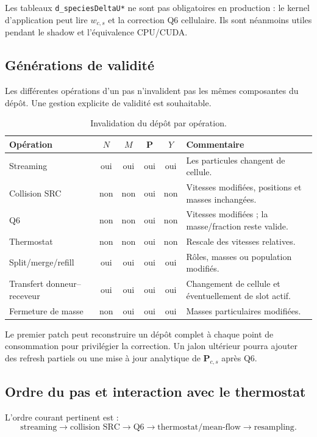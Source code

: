 \documentclass[11pt,a4paper]{article}
\newcommand{\code}[1]{\texttt{#1}}
\newcommand{\vect}[1]{\bm{#1}}
\begin{document}
Les tableaux \code{d\_speciesDeltaU*} ne sont pas obligatoires en production : le kernel d'application peut lire \(w_{c,s}\) et la correction Q6 cellulaire. Ils sont néanmoins utiles pendant le shadow et l'équivalence CPU/CUDA.

\subsection{Générations de validité}

Les différentes opérations d'un pas n'invalident pas les mêmes composantes du dépôt. Une gestion explicite de validité est souhaitable.

\begin{table}[H]
\centering
\caption{Invalidation du dépôt par opération.}
\begin{tabularx}{\textwidth}{@{}lccccX@{}}
\toprule
Opération & $N$ & $M$ & $\vect P$ & $Y$ & Commentaire \\
\midrule
Streaming & oui & oui & oui & oui & Les particules changent de cellule. \\
Collision SRC & non & non & oui & non & Vitesses modifiées, positions et masses inchangées. \\
Q6 & non & non & oui & non & Vitesses modifiées ; la masse/fraction reste valide. \\
Thermostat & non & non & oui & non & Rescale des vitesses relatives. \\
Split/merge/refill & oui & oui & oui & oui & Rôles, masses ou population modifiés. \\
Transfert donneur--receveur & oui & oui & oui & oui & Changement de cellule et éventuellement de slot actif. \\
Fermeture de masse & non & oui & oui & oui & Masses particulaires modifiées. \\
\bottomrule
\end{tabularx}
\end{table}

Le premier patch peut reconstruire un dépôt complet à chaque point de consommation pour privilégier la correction. Un jalon ultérieur pourra ajouter des refresh partiels ou une mise à jour analytique de \(\vect P_{c,s}\) après Q6.

\subsection{Ordre du pas et interaction avec le thermostat}

L'ordre courant pertinent est :
\begin{equation}
  \text{streaming} \rightarrow \text{collision SRC} \rightarrow \text{Q6}
  \rightarrow \text{thermostat/mean-flow} \rightarrow \text{resampling}.
\end{equation}
\end{document}
